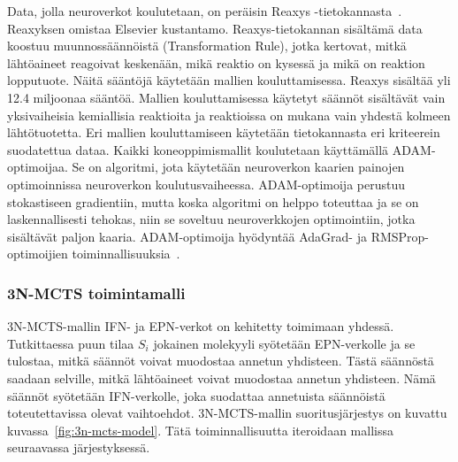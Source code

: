\documentclass[finnish,twoside,censored,tkt,sw-line]{HYthesisML}
\begin{document}
Data, jolla neuroverkot koulutetaan, on peräisin Reaxys -tietokannasta~\cite{reaxys}.
Reaxyksen omistaa Elsevier kustantamo.
Reaxys-tietokannan sisältämä data koostuu muunnossäännöistä (Transformation Rule), jotka kertovat, mitkä lähtöaineet reagoivat keskenään, mikä reaktio on kysessä ja mikä on reaktion lopputuote.
Näitä sääntöjä käytetään mallien kouluttamisessa.
Reaxys sisältää yli 12.4 miljoonaa sääntöä.
Mallien kouluttamisessa käytetyt säännöt sisältävät vain yksivaiheisia kemiallisia reaktioita ja reaktioissa on mukana vain yhdestä kolmeen lähtötuotetta.
Eri mallien kouluttamiseen käytetään tietokannasta eri kriteerein suodatettua dataa.
Kaikki koneoppimismallit koulutetaan käyttämällä ADAM-optimoijaa.
Se on algoritmi, jota käytetään neuroverkon kaarien painojen optimoinnissa neuroverkon koulutusvaiheessa.
ADAM-optimoija perustuu stokastiseen gradientiin, mutta koska algoritmi on helppo toteuttaa ja se on laskennallisesti tehokas, niin se soveltuu neuroverkkojen optimointiin, jotka sisältävät paljon kaaria.
ADAM-optimoija hyödyntää AdaGrad- ja RMSProp-optimoijien toiminnallisuuksia~\cite{kingma2017adam}.

\subsubsection{3N-MCTS toimintamalli}

3N-MCTS-mallin IFN- ja EPN-verkot on kehitetty toimimaan yhdessä.
Tutkittaessa puun tilaa \(S_i\) jokainen molekyyli syötetään EPN-verkolle ja se tulostaa, mitkä säännöt voivat muodostaa annetun yhdisteen.
Tästä säännöstä saadaan selville, mitkä lähtöaineet voivat muodostaa annetun yhdisteen.
Nämä säännöt syötetään IFN-verkolle, joka suodattaa annetuista säännöistä toteutettavissa olevat vaihtoehdot.
3N-MCTS-mallin suoritusjärjestys on kuvattu kuvassa~\ref{fig:3n-mcts-model}.
Tätä toiminnallisuutta iteroidaan mallissa seuraavassa järjestyksessä.
\end{document}

